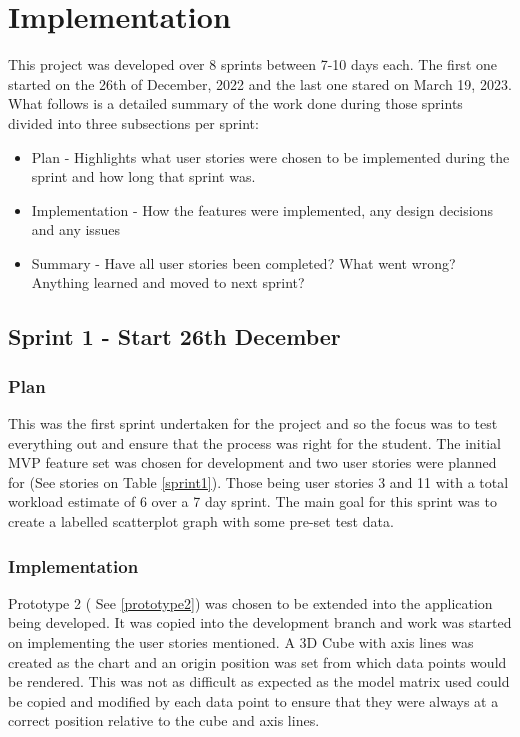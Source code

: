 
\section{Implementation} \label{implementation}
This project was developed over 8 sprints between 7-10 days each. The first one started on the 26th of December, 2022 and the last one stared on March 19, 2023. What follows is a detailed summary of the work done during those sprints divided into three subsections per sprint:
\begin{itemize}
    \item Plan - Highlights what user stories were chosen to be implemented during the sprint and how long that sprint was.
    \item Implementation - How the features were implemented, any design decisions and any issues
    \item Summary - Have all user stories been completed? What went wrong? Anything learned and moved to next sprint?
\end{itemize}

\subsection{Sprint 1 - Start 26th December}
\subsubsection{Plan}
This was the first sprint undertaken for the project and so the focus was to test everything out and ensure that the process was right for the student. The initial MVP feature set was chosen for development and two user stories were planned for (See stories on Table \ref{sprint1}). Those being user stories 3 and 11 with a total workload estimate of 6 over a 7 day sprint. The main goal for this sprint was to create a labelled scatterplot graph with some pre-set test data.

\subsubsection{Implementation}
Prototype 2 ( See \ref{prototype2}) was chosen to be extended into the application being developed. It was copied into the development branch and work was started on implementing the user stories mentioned. A 3D Cube with axis lines was created as the chart and an origin position was set from which data points would be rendered. This was not as difficult as expected as the model matrix used could be copied and modified by each data point to ensure that they were always at a correct position relative to the cube and axis lines.


